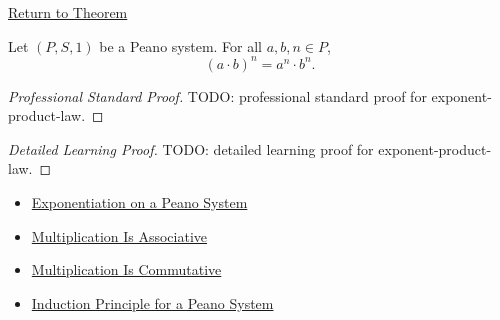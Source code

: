 \newpage
{}
\label{prf:exponent-product-law}

\begin{remark*}[Return]
\hyperref[thm:exponent-product-law]{Return to Theorem}
\end{remark*}

\begin{theorem*}
Let $(P,S,1)$ be a Peano system. For all $a,b,n \in P$,
\[
(a \cdot b)^n = a^n \cdot b^n.
\]
\end{theorem*}

\begin{proof}[Professional Standard Proof]
\LRAProofBodyStart
TODO: professional standard proof for exponent-product-law.
\end{proof}

\begin{proof}[Detailed Learning Proof]
\LRAProofBodyStart
TODO: detailed learning proof for exponent-product-law.
\end{proof}

\begin{remark*}
\end{remark*}

\begin{dependencies}
\begin{itemize}
  \item \hyperref[def:exponentiation-on-peano-system]{Exponentiation on a Peano System}
  \item \hyperref[thm:multiplication-associative]{Multiplication Is Associative}
  \item \hyperref[thm:multiplication-commutative]{Multiplication Is Commutative}
  \item \hyperref[thm:induction-principle-for-peano-system]{Induction Principle for a Peano System}
\end{itemize}
\end{dependencies}

\clearpage
